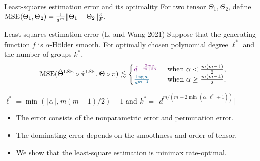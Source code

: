 \documentclass[aspectratio=169,xcolor=dvipsnames]{beamer}
\begin{document}
\begin{frame}{Least-squares estimation error and its optimality}
For two tensor $\Theta_1,\Theta_2$, define $\textup{MSE}(\Theta_1,\Theta_2) = \frac{1}{d^m}\lVert\Theta_1-\Theta_2\rVert_F^2.$
    \begin{block}{Least-squares estimation error (L. and Wang 2021)}
    Suppose that the generating function $f$ is $\alpha$-H\"older smooth. 
  For optimally chosen polynomial degree $\ell^*$ and the number of groups $k^*$,
\begin{align}\label{eq:rateMSE}
\textup{MSE}(\hat\Theta^{\textup{LSE}}\circ\hat\pi^{\textup{LSE}},\Theta\circ\pi)\lesssim  \begin{cases}{\color{Fuchsia}d^{-{2m\alpha\over m+2\alpha}}} & \text{ when } \alpha < \frac{m(m-1)}{2},\\{\color{MidnightBlue}\log d\over d^{m-1}}&\text{ when } \alpha \geq \frac{m(m-1)}{2}.\end{cases}
\end{align}
 
    \end{block}
    \vspace{-0.2cm}
    {\scriptsize\hfill $\ell^* = \min(\lceil\alpha\rceil,m(m-1)/2)-1 $ and $k^* = \lceil  d^{m/ (m+2\min(\alpha,\ell^*+1))}\rceil$}

    \begin{itemize}
        \item The error consists of the {\color{Fuchsia}nonparametric error } and {\color{MidnightBlue} permutation error.} 
        \item The dominating error depends on {\color{red}the smoothness and order of tensor}.
        \item We show that the least-square estimation is {\color{red}minimax rate-optimal}.
    \end{itemize}

\end{frame}
\end{document}
